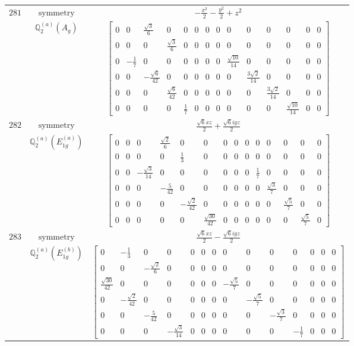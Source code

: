 \documentclass[fleqn,8pt,landscape]{jsarticle}
\begin{document}
\begin{longtable}{ccc}
$ 281 $ & $ \text{symmetry} $ & $ - \frac{x^{2}}{2} - \frac{y^{2}}{2} + z^{2} $ \\
$  $ & $ \mathbb{Q}_{2}^{(a)}(A_{g}) $ & $ \begin{bmatrix} 0 & 0 & \frac{\sqrt{3}}{6} & 0 & 0 & 0 & 0 & 0 & 0 & 0 & 0 & 0 & 0 & 0 \\ 0 & 0 & 0 & \frac{\sqrt{3}}{6} & 0 & 0 & 0 & 0 & 0 & 0 & 0 & 0 & 0 & 0 \\ 0 & - \frac{1}{7} & 0 & 0 & 0 & 0 & 0 & 0 & \frac{\sqrt{10}}{14} & 0 & 0 & 0 & 0 & 0 \\ 0 & 0 & - \frac{\sqrt{6}}{42} & 0 & 0 & 0 & 0 & 0 & 0 & \frac{3 \sqrt{2}}{14} & 0 & 0 & 0 & 0 \\ 0 & 0 & 0 & \frac{\sqrt{6}}{42} & 0 & 0 & 0 & 0 & 0 & 0 & \frac{3 \sqrt{2}}{14} & 0 & 0 & 0 \\ 0 & 0 & 0 & 0 & \frac{1}{7} & 0 & 0 & 0 & 0 & 0 & 0 & \frac{\sqrt{10}}{14} & 0 & 0 \end{bmatrix} $ \\ \hline
$ 282 $ & $ \text{symmetry} $ & $ \frac{\sqrt{6} x z}{2} + \frac{\sqrt{6} i y z}{2} $ \\
$  $ & $ \mathbb{Q}_{2}^{(a)}(E_{1g}^{(a)}) $ & $ \begin{bmatrix} 0 & 0 & 0 & \frac{\sqrt{2}}{6} & 0 & 0 & 0 & 0 & 0 & 0 & 0 & 0 & 0 & 0 \\ 0 & 0 & 0 & 0 & \frac{1}{3} & 0 & 0 & 0 & 0 & 0 & 0 & 0 & 0 & 0 \\ 0 & 0 & - \frac{\sqrt{3}}{14} & 0 & 0 & 0 & 0 & 0 & 0 & \frac{1}{7} & 0 & 0 & 0 & 0 \\ 0 & 0 & 0 & - \frac{5}{42} & 0 & 0 & 0 & 0 & 0 & 0 & \frac{\sqrt{3}}{7} & 0 & 0 & 0 \\ 0 & 0 & 0 & 0 & - \frac{\sqrt{2}}{42} & 0 & 0 & 0 & 0 & 0 & 0 & \frac{\sqrt{5}}{7} & 0 & 0 \\ 0 & 0 & 0 & 0 & 0 & \frac{\sqrt{30}}{42} & 0 & 0 & 0 & 0 & 0 & 0 & \frac{\sqrt{5}}{7} & 0 \end{bmatrix} $ \\ \hline
$ 283 $ & $ \text{symmetry} $ & $ \frac{\sqrt{6} x z}{2} - \frac{\sqrt{6} i y z}{2} $ \\
$  $ & $ \mathbb{Q}_{2}^{(a)}(E_{1g}^{(b)}) $ & $ \begin{bmatrix} 0 & - \frac{1}{3} & 0 & 0 & 0 & 0 & 0 & 0 & 0 & 0 & 0 & 0 & 0 & 0 \\ 0 & 0 & - \frac{\sqrt{2}}{6} & 0 & 0 & 0 & 0 & 0 & 0 & 0 & 0 & 0 & 0 & 0 \\ \frac{\sqrt{30}}{42} & 0 & 0 & 0 & 0 & 0 & 0 & - \frac{\sqrt{5}}{7} & 0 & 0 & 0 & 0 & 0 & 0 \\ 0 & - \frac{\sqrt{2}}{42} & 0 & 0 & 0 & 0 & 0 & 0 & - \frac{\sqrt{5}}{7} & 0 & 0 & 0 & 0 & 0 \\ 0 & 0 & - \frac{5}{42} & 0 & 0 & 0 & 0 & 0 & 0 & - \frac{\sqrt{3}}{7} & 0 & 0 & 0 & 0 \\ 0 & 0 & 0 & - \frac{\sqrt{3}}{14} & 0 & 0 & 0 & 0 & 0 & 0 & - \frac{1}{7} & 0 & 0 & 0 \end{bmatrix} $ \\ \hline

\end{longtable}
\end{document}
